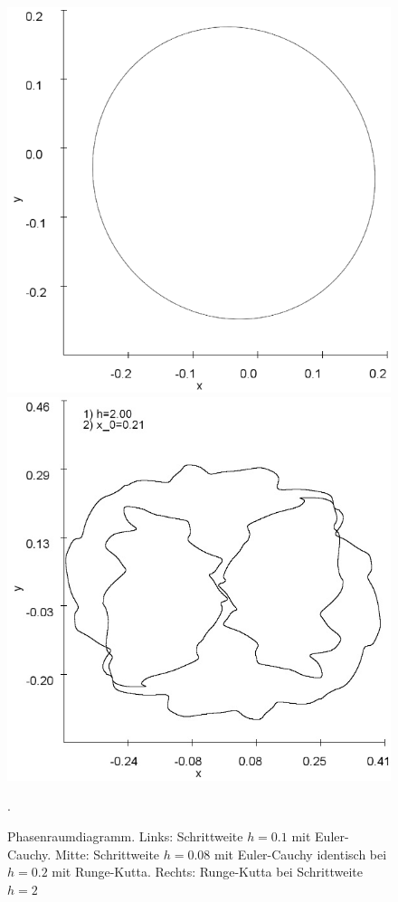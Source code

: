 \documentclass[12pt,a4paper]{article}
\begin{document}
\begin{figure}[!htbp]
\includegraphics[scale=0.25]{duffing-awp1-500k-nach-500k-h0,08-euler}
\includegraphics[scale=0.25]{duffing-awp1-h2-runge-kutta}
\caption{Phasenraumdiagramm. Links: Schrittweite $h=0.1$ mit Euler-Cauchy. Mitte: Schrittweite $h=0.08$ mit Euler-Cauchy identisch bei $h=0.2$ mit Runge-Kutta. Rechts: Runge-Kutta bei Schrittweite $h=2$}. 
\label{fig:duffing-awp1}
\end{figure}
\end{document}
